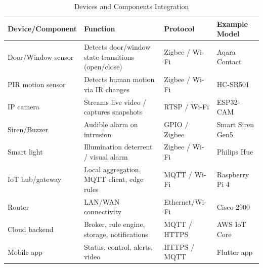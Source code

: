\documentclass[conference]{IEEEtran}
\begin{document}

\begin{table}[t]
\centering
\caption{Devices and Components Integration}
\label{tab:devices-wide}
\small
\renewcommand{\arraystretch}{1.25}
\begin{tabularx}{\textwidth}{l Y l l}
\toprule
\textbf{Device/Component} & \textbf{Function} & \textbf{Protocol} & \textbf{Example Model} \\
\midrule
Door/Window sensor & Detects door/window state transitions (open/close) & Zigbee / Wi-Fi & Aqara Contact \\
PIR motion sensor  & Detects human motion via IR changes                 & Zigbee / Wi-Fi & HC-SR501 \\
IP camera          & Streams live video / captures snapshots             & RTSP / Wi-Fi   & ESP32-CAM \\
Siren/Buzzer       & Audible alarm on intrusion                          & GPIO / Zigbee  & Smart Siren Gen5 \\
Smart light        & Illumination deterrent / visual alarm               & Zigbee / Wi-Fi & Philips Hue \\
IoT hub/gateway    & Local aggregation, MQTT client, edge rules          & MQTT / Wi-Fi   & Raspberry Pi 4 \\
Router             & LAN/WAN connectivity                                & Ethernet/Wi-Fi & Cisco 2900 \\
Cloud backend      & Broker, rule engine, storage, notifications         & MQTT / HTTPS   & AWS IoT Core \\
Mobile app         & Status, control, alerts, video                      & HTTPS / MQTT   & Flutter app \\
\bottomrule
\end{tabularx}
\end{table}
\end{document}
